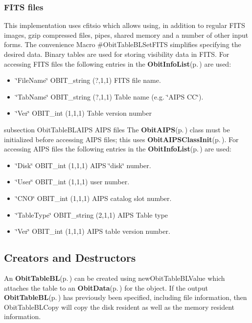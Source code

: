 \subsubsection{FITS files}\label{ObitTableWX_8h_TableFITS}
This implementation uses cfitsio which allows using, in addition to regular FITS images, gzip compressed files, pipes, shared memory and a number of other input forms. The convenience Macro \#Obit\-Table\-BLSet\-FITS simplifies specifying the desired data. Binary tables are used for storing visibility data in FITS. For accessing FITS files the following entries in the {\bf Obit\-Info\-List}{\rm (p.\,\pageref{structObitInfoList})} are used: \begin{itemize}
\item \char`\"{}File\-Name\char`\"{} OBIT\_\-string (?,1,1) FITS file name. \item \char`\"{}Tab\-Name\char`\"{} OBIT\_\-string (?,1,1) Table name (e.g. \char`\"{}AIPS CC\char`\"{}). \item \char`\"{}Ver\char`\"{} OBIT\_\-int (1,1,1) Table version number\end{itemize}
subsection Obit\-Table\-BLAIPS AIPS files The {\bf Obit\-AIPS}{\rm (p.\,\pageref{structObitAIPS})} class must be initialized before accessing AIPS files; this uses {\bf Obit\-AIPSClass\-Init}{\rm (p.\,\pageref{ObitAIPS_8c_a5})}. For accessing AIPS files the following entries in the {\bf Obit\-Info\-List}{\rm (p.\,\pageref{structObitInfoList})} are used: \begin{itemize}
\item \char`\"{}Disk\char`\"{} OBIT\_\-int (1,1,1) AIPS \char`\"{}disk\char`\"{} number. \item \char`\"{}User\char`\"{} OBIT\_\-int (1,1,1) user number. \item \char`\"{}CNO\char`\"{} OBIT\_\-int (1,1,1) AIPS catalog slot number. \item \char`\"{}Table\-Type\char`\"{} OBIT\_\-string (2,1,1) AIPS Table type \item \char`\"{}Ver\char`\"{} OBIT\_\-int (1,1,1) AIPS table version number.\end{itemize}
\subsection{Creators and Destructors}\label{ObitTableBL_8h_ObitTableBLaccess}
An {\bf Obit\-Table\-BL}{\rm (p.\,\pageref{structObitTableBL})} can be created using new\-Obit\-Table\-BLValue which attaches the table to an {\bf Obit\-Data}{\rm (p.\,\pageref{structObitData})} for the object. If the output {\bf Obit\-Table\-BL}{\rm (p.\,\pageref{structObitTableBL})} has previously been specified, including file information, then Obit\-Table\-BLCopy will copy the disk resident as well as the memory resident information.

